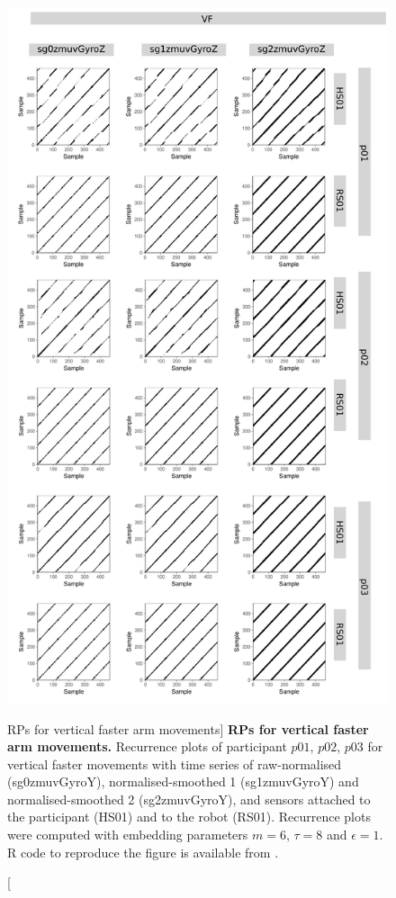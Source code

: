 \begin{figure}
\centering
\includegraphics[height=0.80\textheight]{rp_VF}
\caption
	[RPs for vertical faster arm movements]{
	{\bf RPs for vertical faster arm movements.}	
	Recurrence plots %
	of participant $p01$, $p02$, $p03$ for vertical faster
	movements with time series of raw-normalised (sg0zmuvGyroY), 
	normalised-smoothed 1 (sg1zmuvGyroY) and 
	normalised-smoothed 2 (sg2zmuvGyroY), and 
	sensors attached to the participant (HS01) and to the robot (RS01).
	Recurrence plots were computed with 
	embedding parameters $m=6$, $\tau=8$ and $\epsilon=1$.
	R code to reproduce the figure is available from \cite{hwum2018}.
        }
    \label{fig:rp_VF}
\end{figure}
